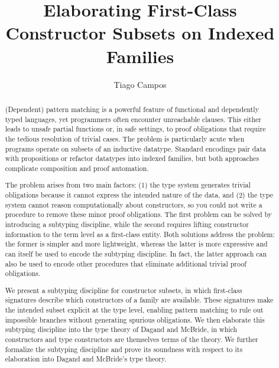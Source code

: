 \documentclass[a4paper, anonymous, UKenglish,cleveref, autoref, thm-restate]{lipics-v2021}
\title{Elaborating First-Class Constructor Subsets on Indexed Families}
\author{Tiago Campos}{UFMG, Brazil}{camposferreiratiago@gmail.com}{https://orcid.org/0000-0002-1825-0097}{}
\begin{document}
\maketitle

\begin{abstract}
(Dependent) pattern matching is a powerful feature of functional and dependently typed languages, yet programmers often encounter unreachable clauses. This either leads to unsafe partial functions or, in safe settings, to proof obligations that require the tedious resolution of trivial cases. The problem is particularly acute when programs operate on subsets of an inductive datatype. Standard encodings pair data with propositions or refactor datatypes into indexed families, but both approaches complicate composition and proof automation.

The problem arises from two main factors: (1) the type system generates trivial obligations because it cannot express the intended nature of the data, and (2) the type system cannot reason computationally about constructors, so you could not write a procedure to remove these minor proof obligations.
The first problem can be solved by introducing a subtyping discipline, while the second requires lifting constructor information to the term level as a first-class entity. Both solutions address the problem: the former is simpler and more lightweight, whereas the latter is more expressive and can itself be used to encode the subtyping discipline. In fact, the latter approach can also be used to encode other procedures that eliminate additional trivial proof obligations.

We present a subtyping discipline for constructor subsets, in which first-class signatures describe which constructors of a family are available. These signatures make the intended subset explicit at the type level, enabling pattern matching to rule out impossible branches without generating spurious obligations. We then elaborate this subtyping discipline into the type theory of Dagand and McBride, in which constructors and type constructors are themselves terms of the theory.
We further formalize the subtyping discipline and prove its soundness with respect to its elaboration into Dagand and McBride's type theory.

\end{abstract}
\end{document}
